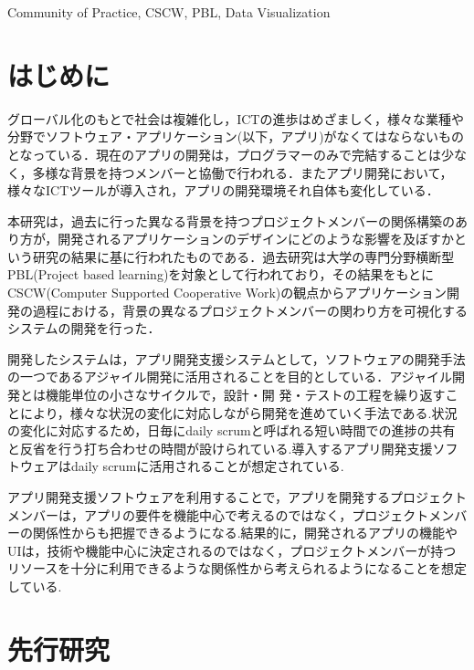 \documentclass[submit,techrep]{ipsj}
\begin{document}
\begin{ekeyword}
Community of Practice, CSCW, PBL, Data Visualization
\end{ekeyword}

\maketitle

\section{はじめに}

グローバル化のもとで社会は複雑化し，ICTの進歩はめざましく，様々な業種や分野でソフトウェア・アプリケーション(以下，アプリ)がなくてはならないものとなっている．現在のアプリの開発は，プログラマーのみで完結することは少なく，多様な背景を持つメンバーと協働で行われる．またアプリ開発において，様々なICTツールが導入され，アプリの開発環境それ自体も変化している．


本研究は，過去に行った異なる背景を持つプロジェクトメンバーの関係構築のあり方が，開発されるアプリケーションのデザインにどのような影響を及ぼすかという研究の結果に基に行われたものである．過去研究は大学の専門分野横断型PBL(Project based learning)を対象として行われており，その結果をもとにCSCW(Computer Supported Cooperative Work)の観点からアプリケーション開発の過程における，背景の異なるプロジェクトメンバーの関わり方を可視化するシステムの開発を行った．


開発したシステムは，アプリ開発支援システムとして，ソフトウェアの開発手法の一つであるアジャイル開発に活用されることを目的としている．アジャイル開発とは機能単位の小さなサイクルで，設計・開 発・テストの工程を繰り返すことにより，様々な状況の変化に対応しながら開発を進めていく手法である.状況の変化に対応するため，日毎にdaily scrumと呼ばれる短い時間での進捗の共有と反省を行う打ち合わせの時間が設けられている.導入するアプリ開発支援ソフトウェアはdaily scrumに活用されることが想定されている.

アプリ開発支援ソフトウェアを利用することで，アプリを開発するプロジェクトメンバーは，アプリの要件を機能中心で考えるのではなく，プロジェクトメンバーの関係性からも把握できるようになる.結果的に，開発されるアプリの機能やUIは，技術や機能中心に決定されるのではなく，プロジェクトメンバーが持つリソースを十分に利用できるような関係性から考えられるようになることを想定している.

\section{先行研究}
\label{previous-research}
\end{document}
